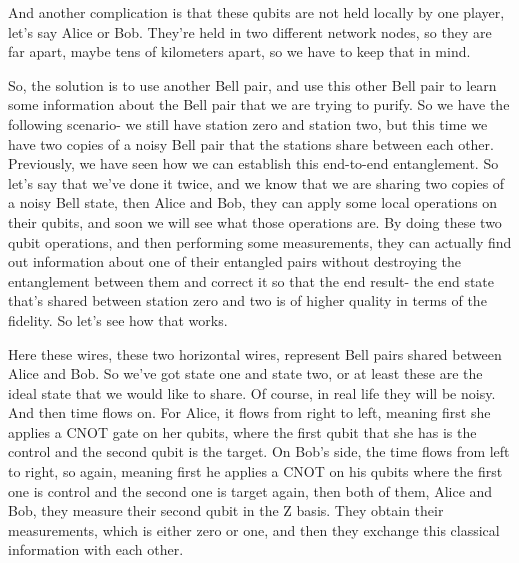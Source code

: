 And another complication is that these qubits are not held locally by one player, let's say Alice or Bob. They're held in two different network nodes, so they are far apart, maybe tens of kilometers apart, so we have to keep that in mind.

So, the solution is to use another Bell pair, and use this other Bell pair to learn some information about the Bell pair that we are trying to purify. So we have the following scenario- we still have station zero and station two, but this time we have two copies of a noisy Bell pair that the stations share between each other. Previously, we have seen how we can establish this end-to-end entanglement. So let's say that we've done it twice, and we know that we are sharing two copies of a noisy Bell state, then Alice and Bob, they can apply some local operations on their qubits, and soon we will see what those operations are. By doing these two qubit operations, and then performing some measurements, they can actually find out information about one of their entangled pairs without destroying the entanglement between them and correct it so that the end result- the end state that's shared between station zero and two is of higher quality in terms of the fidelity. So let's see how that works.

Here these wires, these two horizontal wires, represent Bell pairs shared between Alice and Bob. So we've got state  \ket{\Phi^+} one and state  \ket{\Phi^+} two, or at least these are the ideal state that we would like to share. Of course, in real life they will be noisy. And then time flows on. For Alice, it flows from right to left, meaning first she applies a CNOT gate on her qubits, where the first qubit that she has is the control and the second qubit is the target. On Bob's side, the time flows from left to right, so again, meaning first he applies a CNOT on his qubits where the first one is control and the second one is target again, then both of them, Alice and Bob, they measure their second qubit in the Z basis. They obtain their measurements, which is either zero or one, and then they exchange this classical information with each other.

